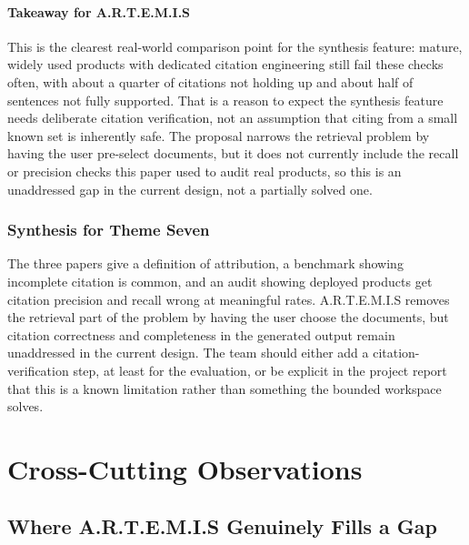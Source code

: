 \documentclass[11pt,a4paper]{report}
\newcommand{\artemis}{A.R.T.E.M.I.S}
\begin{document}
\subsubsection{Takeaway for \artemis{}}

This is the clearest real-world comparison point for the synthesis
feature: mature, widely used products with dedicated citation
engineering still fail these checks often, with about a quarter of
citations not holding up and about half of sentences not fully
supported. That is a reason to expect the synthesis feature needs
deliberate citation verification, not an assumption that citing from a
small known set is inherently safe. The proposal narrows the retrieval
problem by having the user pre-select documents, but it does not
currently include the recall or precision checks this paper used to
audit real products, so this is an unaddressed gap in the current
design, not a partially solved one.

\subsection{Synthesis for Theme Seven}

The three papers give a definition of attribution, a benchmark showing
incomplete citation is common, and an audit showing deployed products
get citation precision and recall wrong at meaningful rates. \artemis{}
removes the retrieval part of the problem by having the user choose the
documents, but citation correctness and completeness in the generated
output remain unaddressed in the current design. The team should either
add a citation-verification step, at least for the evaluation, or be
explicit in the project report that this is a known limitation rather
than something the bounded workspace solves.

\chapter{Cross-Cutting Observations}

\section{Where \artemis{} Genuinely Fills a Gap}
\end{document}
